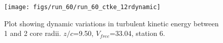 \begin{figure}[H]
\centering
\texttt{[image: figs/run\_60/run\_60\_ctke\_12rdynamic]}
\caption{Plot showing dynamic variations in turbulent kinetic energy between 1 and 2 core radii. $z/c$=9.50, $V_{free}$=33.04, station 6.}
\label{fig:run_60_ctke_12rdynamic}
\end{figure}


